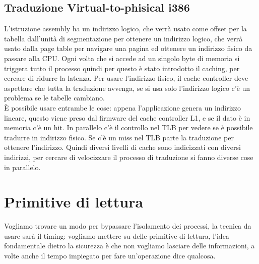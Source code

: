 \documentclass[12pt, oneside]{extbook} %
\begin{document}
\subsection{Traduzione Virtual-to-phisical i386}
L'istruzione assembly ha un indirizzo logico, che verrà usato come offset per la tabella dall'unità di segmentazione per ottenere un indirizzo logico, che verrà usato dalla page table per navigare una pagina ed ottenere un indirizzo fisico da passare alla CPU. Ogni volta che si accede ad un singolo byte di memoria si triggera tutto il processo
quindi per questo è stato introdotto il caching, per cercare di ridurre la latenza. Per usare l'indirizzo fisico, il cache controller deve aspettare che tutta la traduzione avvenga, se si usa solo l'indirizzo logico c'è un problema se le tabelle cambiano.\\ È possibile usare entrambe le cose: appena l'applicazione genera un indirizzo lineare, questo viene preso dal firmware del cache controller L1, e se il dato è in memoria c'è un hit. In parallelo c'è il controllo nel TLB per vedere se è possibile tradurre in indirizzo fisico. Se c'è un miss nel TLB parte la traduzione per ottenere l'indirizzo. Quindi diversi livelli di cache sono indicizzati con diversi indirizzi, per cercare di velocizzare il processo di traduzione si fanno diverse cose in parallelo.
\section{Primitive di lettura}
Vogliamo trovare un modo per bypassare l'isolamento dei processi, la tecnica da usare sarà il timing: vogliamo mettere su delle primitive di lettura, l'idea fondamentale dietro la sicurezza è che non vogliamo lasciare delle informazioni, a volte anche il tempo impiegato per fare un'operazione dice qualcosa. 
\end{document}
